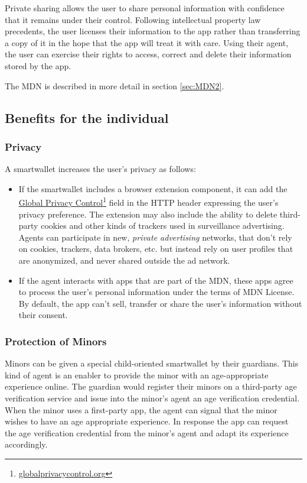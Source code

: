 \documentclass[11pt, oneside]{article}   	%
\newcommand{\hyperfootnote}[1][]{\def\ArgI{{#1}}\hyperfootnoteRelay}
\newcommand\hyperfootnoteRelay[2][]{\href{#1#2}{\ArgI}\footnote{\href{#1#2}{#2}}}
\begin{document}
Private sharing allows the user to share personal information with confidence that it remains under their control. Following intellectual property law precedents, the user licenses their information to the app rather than transferring a copy of it in the hope that the app will treat it with care. Using their agent, the user can exercise their rights to access, correct and delete their information stored by the app.

The MDN is described in more detail in section \ref{sec:MDN2}.

\subsection{Benefits for the individual}

\subsubsection{Privacy}

A smartwallet increases the user's privacy as follows:
\begin{itemize}
	\item If the smartwallet includes a browser extension component, it can add the \hyperfootnote[Global Privacy Control][https://]{globalprivacycontrol.org} field in the HTTP header expressing the user's privacy preference. The extension may also include the ability to delete third-party cookies and other kinds of trackers used in surveillance advertising. Agents can participate in new, \emph{private advertising} networks, that don't rely on cookies, trackers, data brokers, etc. but instead rely on user profiles that are anonymized, and never shared outside the ad network. 
	\item If the agent interacts with apps that are part of the MDN, these apps agree to process the user's personal information under the terms of MDN License. By default, the app can't sell, transfer or share the user's information without their consent. 
\end{itemize}

\subsubsection{Protection of Minors}

Minors can be given a special child-oriented smartwallet by their guardians. This kind of agent is an enabler to  provide the minor with an age-appropriate experience online. The guardian would register their minors on a third-party age verification service and issue into the minor's agent an age verification credential. When the minor uses a first-party app, the agent can signal that the minor wishes to have an age appropriate experience. In response the app can request the age verification credential from the minor's agent and adapt its experience accordingly.
\end{document}
